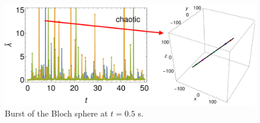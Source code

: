 \documentclass[10pt,letterpaper]{article}
\begin{document}
\begin{figure}
\centering
\includegraphics[width=\textwidth]{burst.pdf}
\caption{Burst of the Bloch sphere at $t=0.5$ s.}
\label{fig:burst}
\end{figure}






\end{document}
